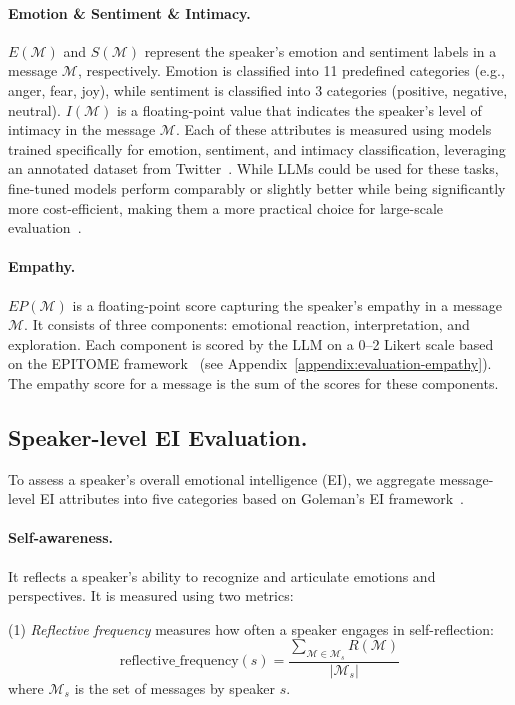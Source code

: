 \paragraph{Emotion \& Sentiment \& Intimacy.}
$E(\mathcal{M})$ and $S(\mathcal{M})$ represent the speaker's emotion and sentiment labels in a message $\mathcal{M}$, respectively.
Emotion is classified into 11 predefined categories (e.g., anger, fear, joy), while sentiment is classified into 3 categories (positive, negative, neutral). 
$I(\mathcal{M})$ is a floating-point value that indicates the speaker's level of intimacy in the message $\mathcal{M}$.
Each of these attributes is measured using models trained specifically for emotion, sentiment, and intimacy classification, leveraging an annotated dataset from Twitter~\cite{antypas2023supertweeteval}.
While LLMs could be used for these tasks, fine-tuned models perform comparably or slightly better while being significantly more cost-efficient, making them a more practical choice for large-scale evaluation~\cite{rathje2024gpt}.


\paragraph{Empathy.}
$EP(\mathcal{M})$ is a floating-point score capturing the speaker's empathy in a message $\mathcal{M}$.
It consists of three components: emotional reaction, interpretation, and exploration. 
Each component is scored by the LLM on a 0–2 Likert scale based on the \textsc{EPITOME} framework~\cite{sharma-etal-2020-computational} (see Appendix~\ref{appendix:evaluation-empathy}). 
The empathy score for a message is the sum of the scores for these components.

\subsection{Speaker-level EI Evaluation.}
\label{ssec:speaker-level-ei}
To assess a speaker’s overall emotional intelligence (EI), we aggregate message-level EI attributes into five categories based on Goleman’s EI framework~\cite{goleman1998working}.

\paragraph{Self-awareness.}
It reflects a speaker’s ability to recognize and articulate emotions and perspectives. 
It is measured using two metrics: 

\vspace{0.2cm}\noindent
(1) \textit{Reflective frequency} measures how often a speaker engages in self-reflection:
\[
\text{reflective\_frequency}(s) = \frac{\sum_{\mathcal{M} \in \mathcal{M}_s} R(\mathcal{M})}{|\mathcal{M}_s|}
\]
where \(\mathcal{M}_s\) is the set of messages by speaker \(s\).

